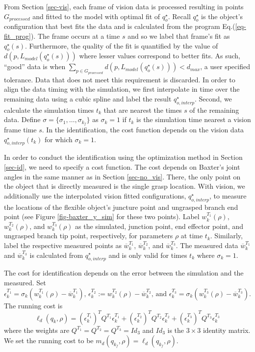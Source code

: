 \documentclass[runningheads,a4paper]{llncs}
\begin{document}
From Section \ref{sec-vis}, each frame of vision data is processed resulting in points $G_{processed}$ and fitted to the model with optimal fit of $q_o^\star$. Recall $q_o^\star$ is the object's configuration that best fits the data and is calculated from the program Eq.(\ref{eq-fit_prog}). The frame occurs at a time $s$ and so we label that frame's fit as $q_o^\star(s)$.  Furthermore, the quality of the fit is quantified by the value of $d(p,L_{model}(q_o^\star(s)))$ where lesser values correspond to better fits.  As such, ``good'' data is when $\sum_{p\in G_{processed}}d(p,L_{model}(q_o^\star(s)))<d_{max}$, a user specified tolerance. Data that does not meet this requirement is discarded.  In order to align the data timing with the simulation, we first interpolate in time over the remaining data using a cubic spline and label the result $q_{o,interp}^\star$.  Second, we calculate the simulation times $t_k$ that are nearest the times $s$ of the remaining data. Define $\sigma = \{\sigma_1,\ldots,\sigma_{k_f}\}$ as $\sigma_k = 1$ if $t_k$ is the simulation time nearest a vision frame time $s$.  In the identification, the cost function depends on the vision data $q_{o,interp}^\star(t_k)$ for which $\sigma_k = 1$.

In order to conduct the identification using the optimization method in Section \ref{sec-id}, we need to specify a cost function.  The cost depends on Baxter's joint angles in the same manner as in Section \ref{sec-no_vis}. There, the only point on the object that is directly measured is the single grasp location. With vision, we additionally use the interpolated vision fitted configurations, $q_{o,interp}^\star$, to measure the locations of the flexible object's juncture point and ungrasped branch end point (see Figure \ref{fig-baxter_y_sim} for these two points). Label $w_k^{T_1}(\rho)$, $w_k^{T_2} (\rho)$, and $w_k^{T_3}(\rho)$ as the simulated, junction point, end effector point, and ungrasped branch tip point, respectively, for parameters $\rho$ at time $t_k$. Similarly, label the respective measured points as $\overline{w}_k^{T_1}$, $\overline{w}_k^{T_2}$, and $\overline{w}_k^{T_3}$. The measured data $\overline{w}_k^{T_1}$ and $\overline{w}_k^{T_3}$ is calculated from $q_{o,interp}^\star$ and is only valid for times $t_k$ where $\sigma_k = 1$.  

The cost for identification depends on the error between the simulation and the measured. Set
\[
\epsilon^{T_1}_k = \sigma_k(w^{T_1}_k(\rho)-\overline{w}^{T_1}_k) \textrm{, } \epsilon^{T_2}_k := w^{T_2}_k(\rho)-\overline{w}^{T_2}_k \textrm{, and } \epsilon^{T_3}_k = \sigma_k(w^{T_3}_k(\rho)-\overline{w}^{T_3}_k).
\]
The running cost is 
\[
\ell_d(q_k,\rho) = (\epsilon^{T_1}_k)^TQ^{T_1}\epsilon^{T_1}_k + (\epsilon^{T_2}_k)^TQ^{T_2}\epsilon^{T_2}_k + (\epsilon^{T_3}_k)^TQ^{T_3}\epsilon^{T_3}_k
\]
where the weights are $Q^{T_1} = Q^{T_2} = Q^{T_3} = Id_{3}$ and $Id_{3}$ is the $3\times3$ identity matrix.  We set the running cost to be $m_d(q_{k_f},\rho) = \ell_d(q_{k_f},\rho)$.
\end{document}
